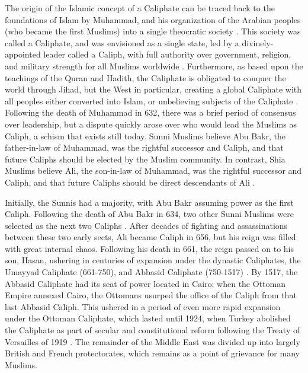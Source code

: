 \documentclass{report}
\begin{document}
The origin of the Islamic concept of a Caliphate can be traced back to the foundations of Islam by Muhammad, and his organization of the Arabian peoples (who became the first Muslims) into a single theocratic society  \cite{schmidt2004great,holt1977cambridge}. This society was called a Caliphate, and was envisioned as a single state, led by a divinely-appointed leader called a Caliph, with full authority over government, religion, and military strength for all Muslims worldwide \cite{lapidus2002history}. Furthermore, as based upon the teachings of the Quran and Hadith, the Caliphate is obligated to conquer the world through Jihad, but the West in particular, creating a global Caliphate with all peoples either converted into Islam, or unbelieving subjects of the Caliphate \cite{dawood2003koran,arabi2008divine,karsh2007islamic}. Following the death of Muhammad in 632, there was a brief period of consensus over leadership, but a dispute quickly arose over who would lead the Muslims as Caliph, a schism that exists still today. Sunni Muslims believe  Abu Bakr, the father-in-law of Muhammad, was the rightful successor and Caliph, and that future Caliphs should be elected by the Muslim community. In contrast, Shia Muslims believe  Ali, the son-in-law of Muhammad, was the rightful successor and Caliph, and that future Caliphs should be direct descendants of Ali \cite{karsh2007islamic,schmidt2004great}. 

Initially, the Sunnis had a majority, with Abu Bakr assuming power as the first Caliph. Following the death of Abu Bakr in 634, two other Sunni Muslims were selected as the next two Caliphs \cite{schmidt2004great}. After decades of fighting and assassinations between these two early sects, Ali became Caliph in 656, but his reign was filled with great internal chaos. Following his death in 661, the reign passed on to his son, Hasan, ushering in centuries of expansion under the dynastic Caliphates, the Umayyad Caliphate (661-750), and Abbasid Caliphate (750-1517) \cite{schmidt2004great,oliver2009caliphate}. By 1517, the Abbasid Caliphate had its seat of power located in Cairo; when the Ottoman Empire annexed Cairo, the Ottomans usurped the office of the Caliph from that last Abbasid Caliph. This ushered in a period of even more rapid expansion under  the Ottoman Caliphate, which lasted until 1924, when Turkey abolished the Caliphate as part of secular and constitutional reform following the Treaty of Versailles of 1919 \cite{schmidt2004great,ozoglu2011caliphate}. The remainder of the Middle East was divided up into largely British and French protectorates, which remains as a point of grievance for many Muslims.
\end{document}
